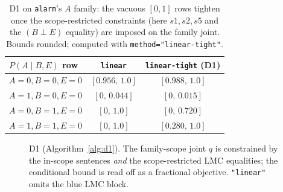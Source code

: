 \documentclass[11pt]{article}
\begin{document}
\begin{table}[t]
\centering
\begin{tabular}{lcc}
\toprule
$P(A\mid B,E)$ row & \texttt{linear} & \texttt{linear-tight} (D1) \\
\midrule
$A{=}0,B{=}0,E{=}0$ & $[0.956,\,1.0]$ & $[0.988,\,1.0]$ \\
$A{=}1,B{=}0,E{=}0$ & $[0,\,0.044]$   & $[0,\,0.015]$ \\
$A{=}0,B{=}1,E{=}0$ & $[0,\,1.0]$     & $[0,\,0.720]$ \\
$A{=}1,B{=}1,E{=}0$ & $[0,\,1.0]$     & $[0.280,\,1.0]$ \\
\bottomrule
\end{tabular}
\caption{D1 on \texttt{alarm}'s $A$ family: the vacuous $[0,1]$ rows tighten once the
  scope-restricted constraints (here $s1,s2,s5$ and the $(B\perp E)$ equality) are imposed on
  the family joint. Bounds rounded; computed with \texttt{method="linear-tight"}.}
\label{tab:d1-alarm}
\end{table}

\begin{figure}[t]
\centering
{}
\caption{D1 (Algorithm~\ref{alg:d1}). The family-scope joint $q$ is constrained by the
  in-scope sentences \emph{and} the scope-restricted LMC equalities; the conditional bound is
  read off as a fractional objective. \texttt{"linear"} omits the blue LMC block.}
\label{fig:d1}
\end{figure}
\end{document}
